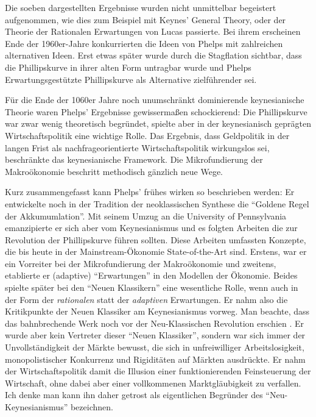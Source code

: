 Die soeben dargestellten Ergebnisse wurden nicht unmittelbar begeistert aufgenommen, wie dies zum Beispiel mit Keynes' General Theory, oder der Theorie der Rationalen Erwartungen von Lucas passierte. Bei ihrem erscheinen Ende der 1960er-Jahre konkurrierten die Ideen von Phelps mit zahlreichen alternativen Ideen. Erst etwas später wurde durch die Stagflation sichtbar, dass die Phillipskurve in ihrer alten Form untragbar wurde und Phelps Erwartungsgestützte Phillipskurve als Alternative zielführender sei.

Für die Ende der 1060er Jahre noch unumschränkt dominierende keynesianische Theorie waren Phelps' Ergebnisse gewissermaßen schockierend: Die Phillipskurve war zwar wenig theoretisch begründet, spielte aber in der keynesianisch geprägten Wirtschaftspolitik eine wichtige Rolle. Das Ergebnis, dass Geldpolitik in der langen Frist als nachfrageorientierte Wirtschaftspolitik wirkungslos sei, beschränkte das keynesianische Framework. Die Mikrofundierung der Makroökonomie beschritt methodisch gänzlich neue Wege. 

Kurz zusammengefasst kann Phelps' frühes wirken so beschrieben werden: Er entwickelte noch in der Tradition der neoklassischen Synthese die "`Goldene Regel der Akkumumlation"'. Mit seinem Umzug an die University of Pennsylvania emanzipierte er sich aber vom Keynesianismus und es folgten Arbeiten die zur Revolution der Phillipskurve führen sollten. Diese Arbeiten umfassten Konzepte, die bis heute in der Mainstream-Ökonomie State-of-the-Art sind. Erstens, war er ein Vorreiter bei der Mikrofundierung der Makroökonomie und zweitens, etablierte er (adaptive) "`Erwartungen"' in den Modellen der Ökonomie. Beides spielte später bei den "`Neuen Klassikern"' eine wesentliche Rolle, wenn auch in der Form der \textit{rationalen} statt der \textit{adaptiven} Erwartungen. Er nahm also die Kritikpunkte der Neuen Klassiker am Keynesianismus vorweg. Man beachte, dass das bahnbrechende Werk \textcite{Phelps1968} noch vor der Neu-Klassischen Revolution erschien \parencite{Lucas1972, Lucas1976}. Er wurde aber kein Vertreter dieser "`Neuen Klassiker"', sondern war sich immer der Unvollständigkeit der Märkte bewusst, die sich in unfreiwilliger Arbeitslosigkeit, monopolistischer Konkurrenz und Rigiditäten auf Märkten ausdrückte. Er nahm der Wirtschaftspolitik damit die Illusion einer funktionierenden Feinsteuerung der Wirtschaft, ohne dabei aber einer vollkommenen Marktgläubigkeit zu verfallen. Ich denke man kann ihn daher getrost als eigentlichen Begründer des "`Neu-Keynesianismus"' bezeichnen.

